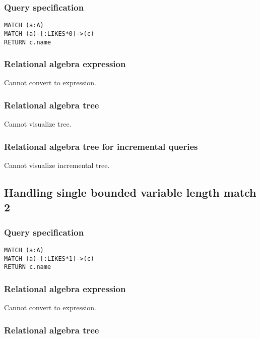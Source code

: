 \subsubsection*{Query specification}

\begin{lstlisting}
MATCH (a:A)
MATCH (a)-[:LIKES*0]->(c)
RETURN c.name
\end{lstlisting}

\subsubsection*{Relational algebra expression}

Cannot convert to expression.

\subsubsection*{Relational algebra tree}

Cannot visualize tree.

\subsubsection*{Relational algebra tree for incremental queries}

Cannot visualize incremental tree.

\subsection{Handling single bounded variable length match 2}

\subsubsection*{Query specification}

\begin{lstlisting}
MATCH (a:A)
MATCH (a)-[:LIKES*1]->(c)
RETURN c.name
\end{lstlisting}

\subsubsection*{Relational algebra expression}

Cannot convert to expression.

\subsubsection*{Relational algebra tree}

